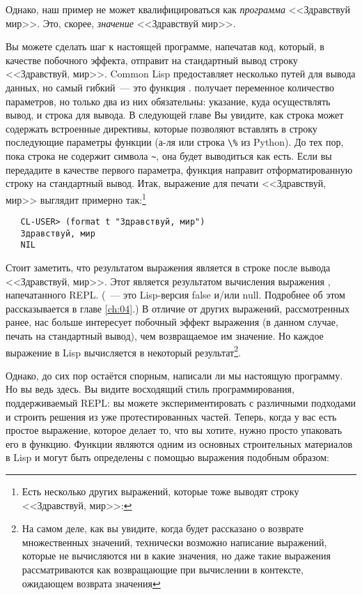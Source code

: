 Однако, наш пример не может квалифицироваться как \emph{программа} <<Здравствуй мир>>.
Это, скорее, \emph{значение} <<Здравствуй мир>>.

Вы можете сделать шаг к настоящей программе, напечатав код, который, в качестве побочного
эффекта, отправит на стандартный вывод строку <<Здравствуй, мир>>. Common Lisp предоставляет
несколько путей для вывода данных, но самый гибкий~--- это функция .  получает
переменное количество параметров, но только два из них обязательны: указание, куда
осуществлять вывод, и строка для вывода. В следующей главе Вы увидите, как строка может
содержать встроенные директивы, которые позволяют вставлять в строку последующие параметры
функции (а-ля  или строка \lstinline|\%| из Python). До тех пор, пока строка
не содержит символа \lstinline|~|, она будет выводиться как есть. Если вы передадите  в
качестве первого параметра, функция  направит отформатированную строку на
стандартный вывод. Итак, выражение  для печати <<Здравствуй, мир>> выглядит примерно
так:\footnote{Есть несколько других выражений, которые тоже выводят строку <<Здравствуй, мир>>:}

\begin{verbatim}
   CL-USER> (format t "Здравствуй, мир")
   Здравствуй, мир
   NIL
\end{verbatim}

Стоит заметить, что результатом выражения  является  в строке после
вывода <<Здравствуй, мир>>. Этот  является результатом вычисления выражения ,
напечатанного REPL. (~--- это Lisp-версия false и/или null. Подробнее об этом
рассказывается в главе \ref{ch:04}.) В отличие от других выражений, рассмотренных ранее, нас больше
интересует побочный эффект выражения  (в данном случае, печать на стандартный
вывод), чем возвращаемое им значение. Но каждое выражение в Lisp вычисляется в некоторый
результат\footnote{На самом деле, как вы увидите, когда будет рассказано о возврате
  множественных значений, технически возможно написание выражений, которые не вычисляются
  ни в какие значения, но даже такие выражения рассматриваются как возвращающие  при
  вычислении в контексте, ожидающем возврата значения}.

Однако, до сих пор остаётся спорным, написали ли мы настоящую программу. Но вы ведь
здесь. Вы видите восходящий стиль программирования, поддерживаемый REPL: вы можете
экспериментировать с различными подходами и строить решения из уже протестированных
частей. Теперь, когда у вас есть простое выражение, которое делает то, что вы хотите,
нужно просто упаковать его в функцию. Функции являются одним из основных строительных
материалов в Lisp и могут быть определены с помощью выражения  подобным образом:

